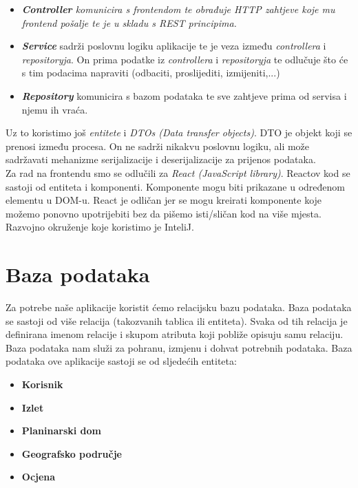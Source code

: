 		\begin{itemize}
			\item 	\textit{\textit{\textbf{Controller}} komunicira s frontendom  te obrađuje HTTP zahtjeve koje mu frontend pošalje te je u skladu s REST principima.}
			\item 	\textit{\textbf{Service}} sadrži poslovnu logiku aplikacije te je veza između \textit{controllera} i \textit{repositoryja}. On prima podatke iz \textit{controllera} i \textit{repositoryja} te odlučuje što će s tim podacima napraviti (odbaciti, proslijediti, izmijeniti,...) 
			\item 	\textit{\textbf{Repository}} komunicira s bazom podataka te sve zahtjeve prima od servisa i njemu ih vraća.
		\end{itemize}
	
			Uz to koristimo još \textit{entitete} i \textit{DTOs (Data transfer objects)}. DTO je objekt koji se prenosi između procesa. On ne sadrži nikakvu poslovnu logiku, ali može sadržavati mehanizme serijalizacije i deserijalizacije za prijenos podataka.\\ 

			Za rad na frontendu smo se odlučili za \textit{React (JavaScript library)}. Reactov kod se sastoji od entiteta i komponenti. Komponente mogu biti  prikazane u određenom elementu u DOM-u. React je odličan jer se mogu kreirati komponente koje možemo ponovno upotrijebiti bez da pišemo isti/sličan kod na više mjesta.\\
			Razvojno okruženje koje koristimo je InteliJ.

				
		\section{Baza podataka}
			
			Za potrebe naše aplikacije koristit ćemo relacijsku bazu podataka. Baza podataka
			se sastoji od više relacija (takozvanih tablica ili entiteta). Svaka od tih relacija je definirana imenom relacije i skupom atributa koji pobliže opisuju samu relaciju.
			Baza podataka nam služi za pohranu, izmjenu i dohvat potrebnih podataka. Baza
			podataka ove aplikacije sastoji se od sljedećih entiteta:
			\begin{itemize}
				\item 	\textbf{Korisnik}
				\item 	\textbf{Izlet}
				\item 	\textbf{Planinarski dom}
				\item 	\textbf{Geografsko područje}
				\item 	\textbf{Ocjena}
			\end{itemize}
				
